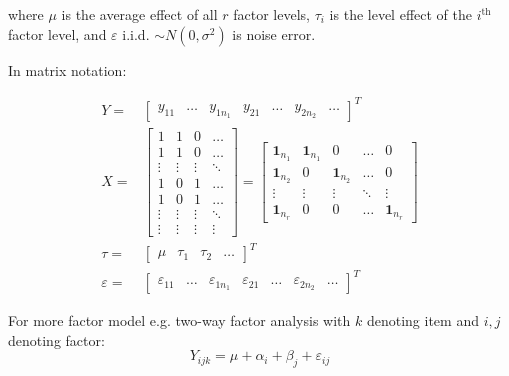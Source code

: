     where $ \mu  $ is the average effect of all $ r $ factor levels, $ \tau_i $ is the level effect of the $ i^\mathrm{th}  $ factor level, and $ \varepsilon  $ i.i.d. $ \sim N(0,\sigma ^2) $ is noise error.
    
    In matrix notation:

    \begin{subequations}\label{EqaFactorAnalysisModel}
        \begin{align}
            Y=&\begin{bmatrix}
        y_{11}&\ldots& y_{1n_1}&y_{21}&\ldots &y_{2n_2}&\ldots
        \end{bmatrix}^T\\
            X=&\begin{bmatrix}
            1&1&0&\ldots\\
            1&1&0&\ldots\\
            \vdots&\vdots&\vdots&\ddots\\
            1&0&1&\ldots\\
            1&0&1&\ldots\\
            \vdots&\vdots&\vdots&\ddots\\
            \vdots&\vdots&\vdots&\vdots
        \end{bmatrix}=
        \begin{bmatrix}
            \mathbf{1}_{n_1}&\mathbf{1}_{n_1}&0&\ldots &0\\
            \mathbf{1}_{n_2}&0&\mathbf{1}_{n_2}&\ldots &0\\
            \vdots&\vdots&\vdots&\ddots&\vdots\\
            \mathbf{1}_{n_r}&0&0&\ldots&\mathbf{1}_{n_r}
        \end{bmatrix}\\
        \tau=&\begin{bmatrix}
            \mu&\tau_1&\tau_2&\ldots
        \end{bmatrix}^T\\
        \varepsilon =&\begin{bmatrix}
            \varepsilon _{11}&\ldots&\varepsilon _{1n_1}&\varepsilon _{21}&\ldots&\varepsilon _{2n_2}&\ldots
                \end{bmatrix}^T
        \end{align}
    \end{subequations}

    For more factor model e.g. two-way factor analysis with $ k $ denoting item and $ i,j $ denoting factor:
    \begin{equation}
         Y_{ijk}=\mu +\alpha _i+\beta _j+\varepsilon  _{ij}
    \end{equation}

